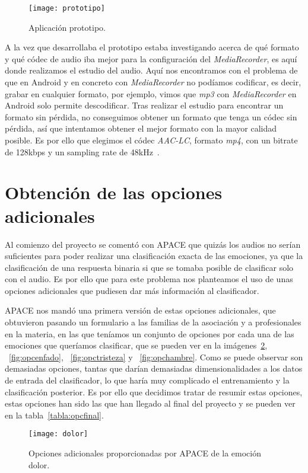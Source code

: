 \begin{figure}
	\centering
	\texttt{[image: prototipo]}
	\caption{Aplicación prototipo.}
	\label{fig:prototipo}
\end{figure}

A la vez que desarrollaba el prototipo estaba investigando acerca de qué formato y qué códec de audio iba mejor para la configuración del \textit{MediaRecorder}, es aquí donde realizamos el estudio del audio. Aquí nos encontramos con el problema de que en Android y en concreto con \textit{MediaRecorder} no podíamos codificar, es decir, grabar en cualquier formato, por ejemplo, vimos que \textit{mp3} con \textit{MediaRecorder} en Android solo permite descodificar. Tras realizar el estudio para encontrar un formato sin pérdida, no conseguimos obtener un formato que tenga un códec sin pérdida, así que intentamos obtener el mejor formato con la mayor calidad posible. Es por ello que elegimos el códec \textit{AAC-LC}, formato \textit{mp4}, con un bitrate de 128kbps y un sampling rate de 48kHz~\cite{mediarecorder}.

\section{Obtención de las opciones adicionales}
Al comienzo del proyecto se comentó con APACE que quizás los audios no serían suficientes para poder realizar una clasificación exacta de las emociones, ya que la clasificación de una respuesta binaria si que se tomaba posible de clasificar solo con el audio. Es por ello que para este problema nos planteamos el uso de unas opciones adicionales que pudiesen dar más información al clasificador.

APACE nos mandó una primera versión de estas opciones adicionales, que obtuvieron pasando un formulario a las familias de la asociación y a profesionales en la materia, en las que teníamos un conjunto de opciones por cada una de las emociones que queríamos clasificar, que se pueden ver en la imágenes~\ref{fig:opcdolor}, ~\ref{fig:opcenfado}, ~\ref{fig:opctristeza} y ~\ref{fig:opchambre}. Como se puede observar son demasiadas opciones, tantas que darían demasiadas dimensionalidades a los datos de entrada del clasificador, lo que haría muy complicado el entrenamiento y la clasificación posterior. Es por ello que decidimos tratar de resumir estas opciones, estas opciones han sido las que han llegado al final del proyecto y se pueden ver en la tabla~\ref{tabla:opcfinal}.

\begin{figure}
	\centering
	\texttt{[image: dolor]}
	\caption{Opciones adicionales proporcionadas por APACE de la emoción dolor.}
	\label{fig:opcdolor}
\end{figure}

